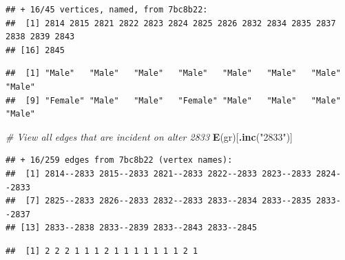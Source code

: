\documentclass[
]{book}
\newenvironment{Shaded}{\begin{snugshade}}{\end{snugshade}}
\newcommand{\CommentTok}[1]{\textcolor[rgb]{0.56,0.35,0.01}{\textit{#1}}}
\newcommand{\FunctionTok}[1]{\textcolor[rgb]{0.13,0.29,0.53}{\textbf{#1}}}
\newcommand{\NormalTok}[1]{#1}
\newcommand{\SpecialCharTok}[1]{\textcolor[rgb]{0.81,0.36,0.00}{\textbf{#1}}}
\newcommand{\StringTok}[1]{\textcolor[rgb]{0.31,0.60,0.02}{#1}}
\begin{document}
\begin{verbatim}
## + 16/45 vertices, named, from 7bc8b22:
##  [1] 2814 2815 2821 2822 2823 2824 2825 2826 2832 2834 2835 2837 2838 2839 2843
## [16] 2845
\end{verbatim}

\begin{Shaded}
\end{Shaded}

\begin{verbatim}
##  [1] "Male"   "Male"   "Male"   "Male"   "Male"   "Male"   "Male"   "Male"  
##  [9] "Female" "Male"   "Male"   "Female" "Male"   "Male"   "Male"   "Male"
\end{verbatim}

\begin{Shaded}
\begin{Highlighting}[]
\CommentTok{\# View all edges that are incident on alter 2833}
\FunctionTok{E}\NormalTok{(gr)[}\FunctionTok{.inc}\NormalTok{(}\StringTok{"2833"}\NormalTok{)]}
\end{Highlighting}
\end{Shaded}

\begin{verbatim}
## + 16/259 edges from 7bc8b22 (vertex names):
##  [1] 2814--2833 2815--2833 2821--2833 2822--2833 2823--2833 2824--2833
##  [7] 2825--2833 2826--2833 2832--2833 2833--2834 2833--2835 2833--2837
## [13] 2833--2838 2833--2839 2833--2843 2833--2845
\end{verbatim}

\begin{Shaded}
\end{Shaded}

\begin{verbatim}
##  [1] 2 2 2 1 1 1 2 1 1 1 1 1 1 1 2 1
\end{verbatim}

\begin{Shaded}
\end{Shaded}
\end{document}
